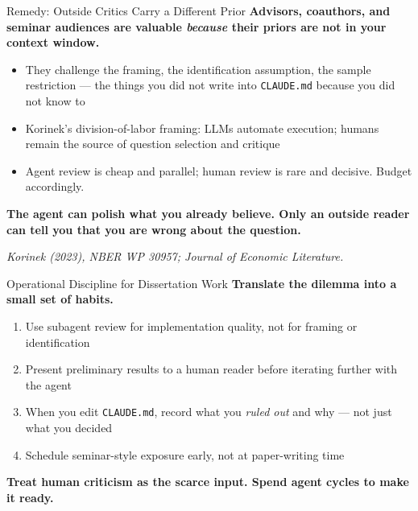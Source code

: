 \documentclass[10pt,english,aspectratio=169]{beamer}
\begin{document}
\begin{frame}{Remedy: Outside Critics Carry a Different Prior}
\textbf{Advisors, coauthors, and seminar audiences are valuable \textit{because} their priors are not in your context window.}

\vspace{0.25cm}

\begin{itemize}
    \item They challenge the framing, the identification assumption, the sample restriction --- the things you did not write into \texttt{CLAUDE.md} because you did not know to
    \item Korinek's division-of-labor framing: LLMs automate execution; humans remain the source of question selection and critique
    \item Agent review is cheap and parallel; human review is rare and decisive. Budget accordingly.
\end{itemize}

\vspace{0.25cm}

\textbf{The agent can polish what you already believe. Only an outside reader can tell you that you are wrong about the question.}

\vspace{0.15cm}
{\scriptsize \textit{Korinek (2023), NBER WP 30957; Journal of Economic Literature.}}
\end{frame}

\begin{frame}{Operational Discipline for Dissertation Work}
\textbf{Translate the dilemma into a small set of habits.}

\vspace{0.25cm}

\begin{enumerate}
    \item Use subagent review for implementation quality, not for framing or identification
    \item Present preliminary results to a human reader before iterating further with the agent
    \item When you edit \texttt{CLAUDE.md}, record what you \textit{ruled out} and why --- not just what you decided
    \item Schedule seminar-style exposure early, not at paper-writing time
\end{enumerate}

\vspace{0.25cm}

\textbf{Treat human criticism as the scarce input. Spend agent cycles to make it ready.}
\end{frame}
\end{document}
